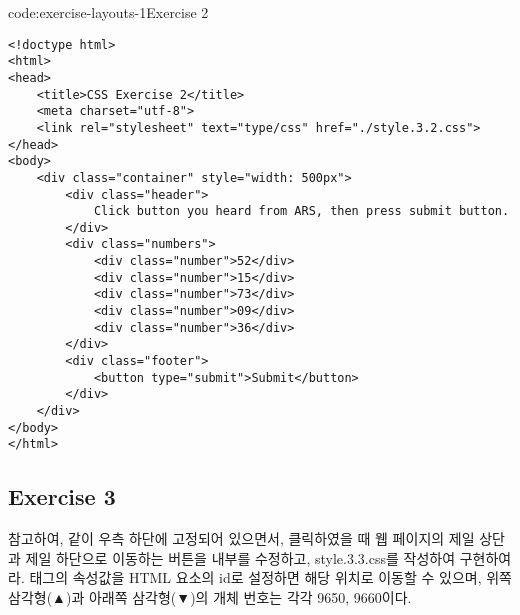 \begin{codeenv}{code:exercise-layouts-1}{Exercise 2}\begin{verbatim}
<!doctype html>
<html>
<head>
    <title>CSS Exercise 2</title>
    <meta charset="utf-8">
    <link rel="stylesheet" text="type/css" href="./style.3.2.css">
</head>
<body>
    <div class="container" style="width: 500px">
        <div class="header">
            Click button you heard from ARS, then press submit button.
        </div>
        <div class="numbers">
            <div class="number">52</div>
            <div class="number">15</div>
            <div class="number">73</div>
            <div class="number">09</div>
            <div class="number">36</div>
        </div>
        <div class="footer">
            <button type="submit">Submit</button>
        </div>
    </div>
</body>
</html>
\end{verbatim}
\end{codeenv}

\subsection*{Exercise 3}

\를 참고하여, \와 같이 우측 하단에 고정되어 있으면서, 클릭하였을 때 웹 페이지의 제일 상단과 제일 하단으로 이동하는 버튼을  내부를 수정하고, style.3.3.css를 작성하여 구현하여라.  태그의  속성값을 HTML 요소의 id로 설정하면 해당 위치로 이동할 수 있으며, 위쪽 삼각형(▲)과 아래쪽 삼각형(▼)의 개체 번호는 각각 9650, 9660이다.

    {}

